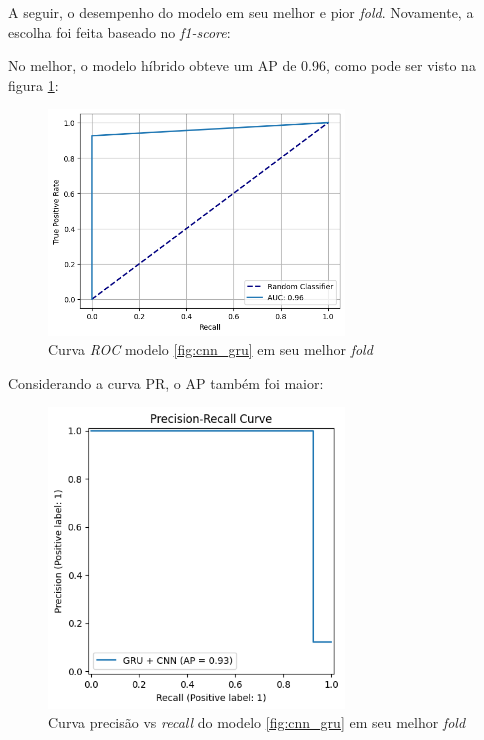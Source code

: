 \documentclass[
    12pt,                %
    openright,           %
    oneside,             %
    a4paper,             %
    brazil               %
]{abntex2}
\begin{document}
A seguir, o desempenho do modelo em seu melhor e pior \textit{fold}. Novamente, a escolha foi feita baseado no \textit{f1-score}:

No melhor, o modelo híbrido obteve um AP de 0.96, como pode ser visto na figura \ref{fig:roc_cnn_gru_melhor_fold}:


\begin{figure}[H]
  \centering
   \includegraphics[width=0.7\textwidth]{figuras/modelos_resultados/gru_cnn/roc_cnn_melhor_fold_1.png} 
  \caption{Curva \textit{ROC} modelo \ref{fig:cnn_gru} em seu melhor \textit{fold}}
  \label{fig:roc_cnn_gru_melhor_fold}
\end{figure}

Considerando a curva PR, o AP também foi maior:

\begin{figure}[H]
  \centering
   \includegraphics[width=0.7\textwidth]{figuras/modelos_resultados/gru_cnn/ap_gru_cnn_melhor_fold_1.png} 
  \caption{Curva precisão vs \textit{recall} do modelo \ref{fig:cnn_gru} em seu melhor \textit{fold}}
  \label{fig:ap_cnn_gru_melhor_fold}
\end{figure}
\end{document}
